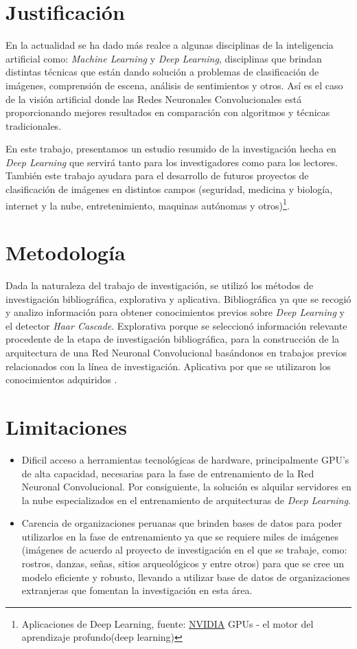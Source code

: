 \section{Justificación}
En la actualidad se ha dado más realce a algunas disciplinas de la inteligencia artificial como: \textit{Machine Learning} y \textit{Deep Learning}, disciplinas que brindan distintas técnicas que están dando solución a problemas de clasificación de imágenes, comprensión de escena, análisis de sentimientos y otros. Así es el caso de la visión artificial donde las Redes Neuronales Convolucionales está proporcionando mejores resultados en comparación con algoritmos y técnicas tradicionales.

En este trabajo, presentamos un estudio resumido de la investigación hecha en \textit{Deep Learning} que servirá tanto para los investigadores como para los lectores. También este trabajo ayudara para el desarrollo de futuros proyectos de clasificación de imágenes en distintos campos (seguridad, medicina y biología, internet y la nube, entretenimiento, maquinas autónomas y otros)\footnote[6]{Aplicaciones de Deep Learning, fuente: \href{https://developer.nvidia.com/deep-learning}{NVIDIA} GPUs - el motor del aprendizaje profundo(deep learning)}.


\section{Metodología}
Dada la naturaleza del trabajo de investigación, se utilizó los métodos de investigación bibliográfica, explorativa y aplicativa. Bibliográfica ya que se recogió y analizo información para obtener conocimientos previos sobre \textit{Deep Learning} y el detector \textit{Haar Cascade}. Explorativa porque se seleccionó información relevante procedente de la etapa de investigación bibliográfica, para la construcción de la arquitectura de una Red Neuronal Convolucional basándonos en trabajos previos relacionados con la línea de investigación. Aplicativa por que se utilizaron los conocimientos adquiridos \cite{19sabino1994hacer}\cite{23silva2001metodologia}.


\section{Limitaciones}
\begin{itemize}
\item Dificil acceso a herramientas tecnológicas de hardware, principalmente GPU's de alta capacidad, necesarias para la fase de entrenamiento de la Red Neuronal Convolucional. Por consiguiente, la solución es alquilar servidores en la nube especializados en el entrenamiento de arquitecturas de \textit{Deep Learning}.
\item Carencia de organizaciones peruanas que brinden bases de datos para poder utilizarlos en la fase de entrenamiento ya que se requiere miles de imágenes (imágenes de acuerdo al proyecto de investigación en el que se trabaje, como: rostros, danzas, señas, sitios arqueológicos y entre otros) para que se cree un modelo eficiente y robusto, llevando a utilizar base de datos de organizaciones extranjeras que fomentan la investigación en esta área.
\end{itemize}
\newpage
